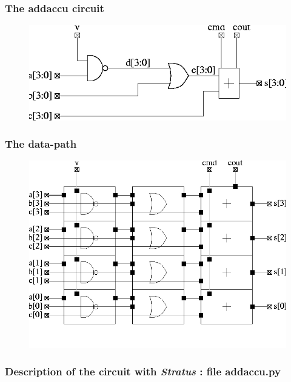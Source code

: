 \subsubsection{The addaccu circuit}

\begin{figure}[h!]
\centering
\includegraphics[width=.9\textwidth]{./images/add1.png}
\end{figure}
  
\newpage
\subsubsection{The data-path}

\begin{figure}[h!]
\centering
\includegraphics[width=.9\textwidth]{./images/add2.png}
\end{figure}

\newpage
\subsubsection{Description of the circuit with \emph{Stratus} : file addaccu.py}

